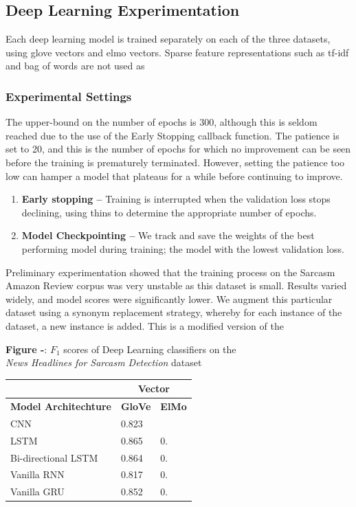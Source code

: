 \documentclass[12pt,a4paper]{article}
\begin{document}

\newpage
\subsection{Deep Learning Experimentation}
\noindent Each deep learning model is trained separately on each of the three datasets, using glove vectors and elmo vectors. Sparse feature representations such as tf-idf and bag of words are not used as

\subsubsection{Experimental Settings}
The upper-bound on the number of epochs is 300, although this is seldom reached due to the use of the Early Stopping callback function. The patience is set to 20, and this is the number of epochs for which no improvement can be seen before the training is prematurely terminated. However, setting the patience too low can hamper a model that plateaus for a while before continuing to improve.

\begin{enumerate}
	\item \textbf{Early stopping --} Training is interrupted when the validation loss stops declining, using thins to determine the appropriate number of epochs.
	\item \textbf{Model Checkpointing --} We track and save the weights of the best performing model during training; the model with the lowest validation loss.
\end{enumerate}

Preliminary experimentation showed that the training process on the Sarcasm Amazon Review corpus was very unstable as this dataset is small. Results varied widely, and model scores were significantly lower. We augment this particular dataset using a synonym replacement strategy, whereby for each instance of the dataset, a new instance is added. This is a modified version of the 


\begin{center}
	\textbf{Figure -}: $F_1$ scores of Deep Learning classifiers on the \\\textit{News Headlines for Sarcasm Detection} dataset
\end{center}

\begin{center}
	\begin{tabular}{|p{4.7cm}||p{1.2cm}|p{1.5cm}|}
		\hline
		& \multicolumn{2}{|c|}{\textbf{Vector}} \\
		\hline
		\textbf{Model Architechture}& \textbf{GloVe} & \textbf{ElMo}\\
		\hline\hline
		CNN   & 0.823   & \\
		LSTM &   0.865 & 0.\\
		Bi-directional LSTM & 0.864 & 0.\\
		Vanilla RNN &0.817 & 0.\\
		Vanilla GRU &0.852 & 0.\\
		\hline
	\end{tabular}
\end{center}
\end{document}
